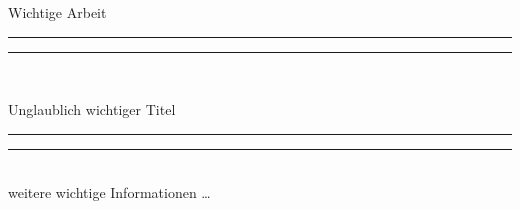 \begin{titlepage}
    \doublespacing
    \scshape
    \begin{center}
        \begin{large}
            Wichtige Arbeit\\[\baselineskip]
        \end{large}
        \rule{\textwidth}{1.6pt}\vspace*{-\baselineskip}\vspace*{2pt}
        \rule{\textwidth}{0.4pt}\\[0.6\baselineskip]
        \begin{LARGE}
            Unglaublich wichtiger Titel
        \end{LARGE}
        \rule{\textwidth}{0.4pt}\vspace*{-\baselineskip}\vspace{3.2pt}
        \rule{\textwidth}{1.6pt}\\[3\baselineskip]
        \normalfont
        weitere wichtige Informationen \ldots
    \end{center}
\end{titlepage}
